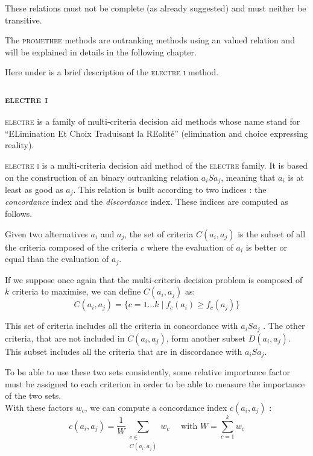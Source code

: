 These relations must not be complete (as already suggested) and must neither be transitive. 

The \textsc{promethee} methods are outranking methods using an valued relation and will be explained in details in the following chapter.

Here under is a brief description of the \textsc{electre i} method.

\subsubsection{\textsc{electre i} } \label{sec:electre}


\textsc{electre} is a family of multi-criteria decision aid methods whose name stand for ``ELimination Et Choix Traduisant la REalité'' (elimination and choice expressing reality).


\textsc{electre i} is a multi-criteria decision aid method of the \textsc{electre} family. It is based on the construction of an binary outranking relation $a_iSa_j$, meaning that $a_i$ is at least as good as $a_j$. This relation is built according to two indices \cite{Roy1968}: the \textit{concordance} index and the \textit{discordance} index.
These indices are computed as follows.

Given two alternatives $a_i$ and $a_j$, the set of criteria $C(a_i,a_j)$ is the subset of all the criteria composed of the criteria $c$ where the evaluation of $a_i$ is better or equal than the evaluation of $a_j$.

If we suppose once again that the multi-criteria decision problem is composed of $k$ criteria to maximise, we can define $C(a_i,a_j)$ as:
\begin{equation}
    C(a_i,a_j) = \{c=1\dots k \mid f_c(a_i) \ge f_c(a_j)\}
    \label{eq:electre_concordance_set}
\end{equation}

This set of criteria includes all the criteria in concordance with $a_iSa_j$ \cite{Roy1968}. The other criteria, that are not included in $C(a_i,a_j)$, form another subset $D(a_i,a_j)$. This subset includes all the criteria that are in discordance with $a_iSa_j$.

To be able to use these two sets consistently, some relative importance factor must be assigned to each criterion in order to be able to measure the importance of the two sets. \\
With these factors $w_c$, we can compute a concordance index $c(a_i,a_j)$ \cite{Roy1968}:
\begin{equation}
    c(a_i,a_j) = \frac{1}{W}\sum\limits_{\substack{c \in \\ C(a_i,a_j)}} w_c \quad \text{ with } W=\sum\limits_{c=1}^k w_c
    \label{eq:electre_concordance_index}
\end{equation}

